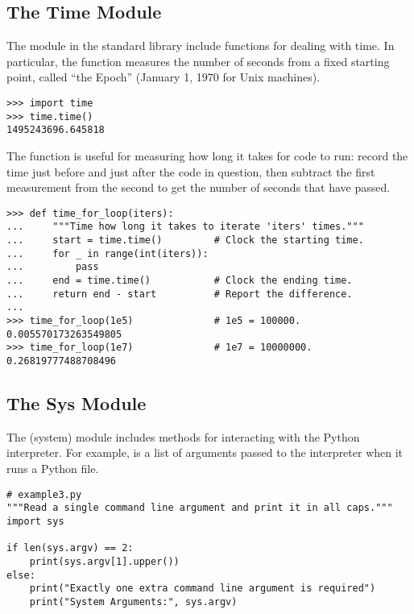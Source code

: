 \subsection*{The Time Module} %

The  module in the standard library include functions for dealing with time.
In particular, the  function measures the number of seconds from a fixed starting point, called ``the Epoch'' (January 1, 1970 for Unix machines).

\begin{lstlisting}
>>> import time
>>> time.time()
1495243696.645818
\end{lstlisting}

The  function
is useful for measuring how long it takes for code to run: record the time just before and just after the code in question, then subtract the first measurement from the second to get the number of seconds that have passed.

\begin{lstlisting}
>>> def time_for_loop(iters):
...     """Time how long it takes to iterate 'iters' times."""
...     start = time.time()         # Clock the starting time.
...     for _ in range(int(iters)):
...         pass
...     end = time.time()           # Clock the ending time.
...     return end - start          # Report the difference.
...
>>> time_for_loop(1e5)              # 1e5 = 100000.
0.005570173263549805
>>> time_for_loop(1e7)              # 1e7 = 10000000.
0.26819777488708496
\end{lstlisting}

\subsection*{The Sys Module} %

The  (system) module includes methods for interacting with the Python interpreter.
For example,  is a list of arguments passed to the interpreter when it runs a Python file.

\begin{lstlisting}
# example3.py
"""Read a single command line argument and print it in all caps."""
import sys

if len(sys.argv) == 2:
    print(sys.argv[1].upper())
else:
    print("Exactly one extra command line argument is required")
    print("System Arguments:", sys.argv)
\end{lstlisting}

